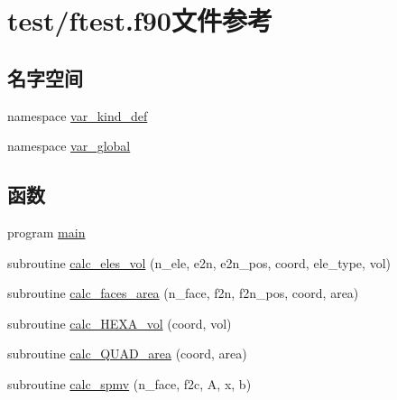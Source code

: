 \hypertarget{test_2ftest_8f90}{
\section{test/ftest.f90文件参考}
\label{test_2ftest_8f90}
}
\subsection*{名字空间}
\begin{DoxyCompactItemize}
\item 
namespace \hyperlink{namespacevar__kind__def}{var\_\-kind\_\-def}
\item 
namespace \hyperlink{namespacevar__global}{var\_\-global}
\end{DoxyCompactItemize}
\subsection*{函数}
\begin{DoxyCompactItemize}
\item 
program \hyperlink{test_2ftest_8f90_a8ec2266d83cd6c0b762cbcbc92c0af3d}{main}
\item 
subroutine \hyperlink{test_2ftest_8f90_ab0feb0b96896d0783a452ceb0884de54}{calc\_\-eles\_\-vol} (n\_\-ele, e2n, e2n\_\-pos, coord, ele\_\-type, vol)
\item 
subroutine \hyperlink{test_2ftest_8f90_a65b36ff25ffa106dab5c6b52332982e1}{calc\_\-faces\_\-area} (n\_\-face, f2n, f2n\_\-pos, coord, area)
\item 
subroutine \hyperlink{test_2ftest_8f90_aedcabc3101935ffa79dac989cdf8cf09}{calc\_\-HEXA\_\-vol} (coord, vol)
\item 
subroutine \hyperlink{test_2ftest_8f90_a638fb93022b93255d8000bacff09a674}{calc\_\-QUAD\_\-area} (coord, area)
\item 
subroutine \hyperlink{test_2ftest_8f90_a5595358e7ada913cd10a206235165422}{calc\_\-spmv} (n\_\-face, f2c, A, x, b)
\end{DoxyCompactItemize}


